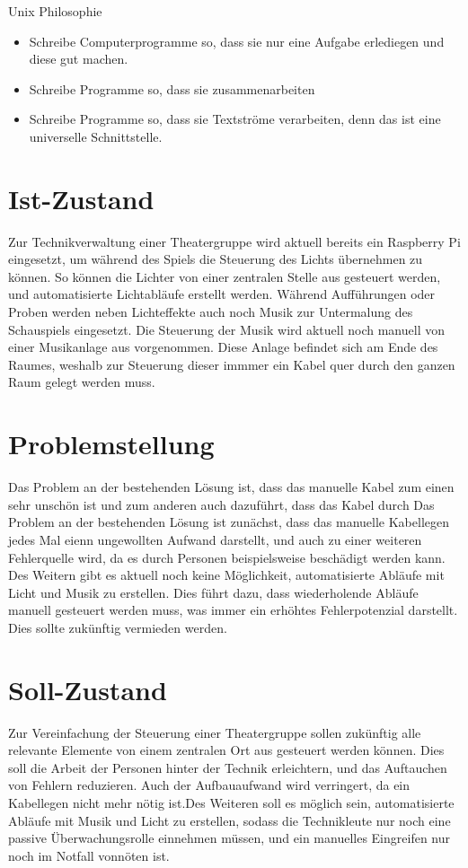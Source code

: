 Unix Philosophie
\begin{itemize}
\item Schreibe Computerprogramme so, dass sie nur eine Aufgabe erlediegen und
diese gut machen.
\item Schreibe Programme so, dass sie zusammenarbeiten
\item Schreibe Programme so, dass sie Textströme verarbeiten, denn das ist eine
universelle Schnittstelle.
\end{itemize}


\section{Ist-Zustand}
Zur Technikverwaltung einer Theatergruppe wird aktuell bereits ein Raspberry
Pi eingesetzt, um während des Spiels die Steuerung des Lichts übernehmen zu
können. So können die Lichter von einer zentralen Stelle aus gesteuert werden,
und automatisierte Lichtabläufe erstellt werden. Während Aufführungen oder
Proben werden neben Lichteffekte auch noch Musik zur Untermalung des
Schauspiels eingesetzt. Die Steuerung der Musik wird aktuell noch manuell von
einer Musikanlage aus vorgenommen. Diese Anlage befindet sich am Ende des
Raumes, weshalb zur Steuerung dieser immmer ein Kabel quer durch den ganzen
Raum gelegt werden muss.

\section{Problemstellung}
Das Problem an der bestehenden Lösung ist, dass das manuelle Kabel zum einen
sehr unschön ist und zum anderen auch dazuführt, dass das Kabel durch 
Das Problem an der bestehenden Lösung ist zunächst, dass das manuelle
Kabellegen jedes Mal eienn ungewollten Aufwand darstellt, und auch zu einer
weiteren Fehlerquelle wird, da es durch Personen beispielsweise beschädigt
werden kann. Des Weitern gibt es aktuell noch keine Möglichkeit, automatisierte
Abläufe mit Licht und Musik zu erstellen. Dies führt dazu, dass wiederholende
Abläufe manuell gesteuert werden muss, was immer ein erhöhtes Fehlerpotenzial
darstellt. Dies sollte zukünftig vermieden werden.


\section{Soll-Zustand}
Zur Vereinfachung der Steuerung einer Theatergruppe sollen zukünftig alle
relevante Elemente von einem zentralen Ort aus gesteuert werden können. Dies
soll die Arbeit der Personen hinter der Technik erleichtern, und das Auftauchen
von Fehlern reduzieren. Auch der Aufbauaufwand wird verringert, da ein
Kabellegen nicht mehr nötig ist.Des Weiteren soll es möglich sein,
automatisierte Abläufe mit Musik und Licht zu erstellen, sodass die
Technikleute nur noch eine passive Überwachungsrolle einnehmen müssen, und ein
manuelles Eingreifen nur noch im
Notfall vonnöten ist. 


